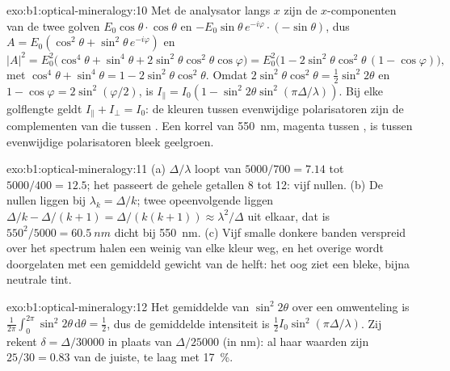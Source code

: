 \begin{solution}{exo:b1:optical-mineralogy:10}
Met de analysator langs $x$ zijn de $x$-componenten van de twee golven
$E_0\cos\theta\cdot\cos\theta$ en $-E_0\sin\theta\,e^{-i\varphi}\cdot(-\sin\theta)$,
dus $A = E_0(\cos^2\theta + \sin^2\theta\,e^{-i\varphi})$ en
\[
  |A|^2 = E_0^2\bigl(\cos^4\theta + \sin^4\theta + 2\sin^2\theta\cos^2\theta\cos\varphi\bigr)
  = E_0^2\bigl(1 - 2\sin^2\theta\cos^2\theta\,(1 - \cos\varphi)\bigr),
\]
met $\cos^4\theta + \sin^4\theta = 1 - 2\sin^2\theta\cos^2\theta$. Omdat
$2\sin^2\theta\cos^2\theta = \frac12\sin^2 2\theta$ en $1 - \cos\varphi =
2\sin^2(\varphi/2)$, is $I_\parallel = I_0(1 - \sin^2 2\theta\sin^2(\pi\Delta/\lambda))$.
Bij elke golflengte geldt $I_\parallel + I_\perp = I_0$: de kleuren tussen evenwijdige
polarisatoren zijn de complementen van die tussen . Een korrel van
\qty{550}{nm}, magenta tussen , is tussen evenwijdige polarisatoren bleek geelgroen.
\end{solution}

\begin{solution}{exo:b1:optical-mineralogy:11}
(a) $\Delta/\lambda$ loopt van $5000/700 = 7.14$ tot $5000/400 = 12.5$; het passeert de gehele getallen 8 tot 12:
vijf nullen. (b) De nullen liggen bij $\lambda_k = \Delta/k$; twee opeenvolgende liggen $\Delta/k - \Delta/(k + 1) =
\Delta/(k(k + 1)) \approx \lambda^2/\Delta$ uit elkaar, dat is $550^2/5000 =
\qty{60.5}{nm}$ dicht bij \qty{550}{nm}. (c) Vijf smalle donkere banden verspreid over het spectrum halen een weinig van
elke kleur weg, en het overige wordt doorgelaten met een gemiddeld gewicht van de helft: het oog ziet een bleke, bijna
neutrale tint.
\end{solution}

\begin{solution}{exo:b1:optical-mineralogy:12}
Het gemiddelde van $\sin^2 2\theta$ over een omwenteling is $\frac1{2\pi}\int_0^{2\pi}\sin^2 2\theta\,
\mathrm d\theta = \frac12$, dus de gemiddelde intensiteit is
$\frac12 I_0\sin^2(\pi\Delta/\lambda)$. Zij rekent $\delta = \Delta/30000$
in plaats van $\Delta/25000$ (in nm): al haar waarden zijn $25/30 = 0.83$ van de
juiste, te laag met \qty{17}{\percent}.
\end{solution}

